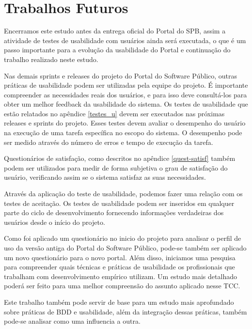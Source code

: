 \section{Trabalhos Futuros}

Encerramos este estudo antes da entrega oficial do Portal do SPB, assim a atividade de testes de usabilidade com usuários ainda será executada, o que é um passo importante para a evolução da usabilidade do Portal e continuação do trabalho realizado neste estudo.

Nas demais sprints e releases do projeto do Portal do Software Público, outras práticas de usabilidade podem ser utilizadas pela equipe do projeto. É importante compreender as necessidades reais dos usuários, e para isso deve consultá-los para obter um melhor feedback da usabilidade do sistema. Os testes de usabilidade que estão relatados no apêndice \ref{testes_u} devem ser executados nas próximas releases e sprints do projeto. Esses testes devem avaliar o desempenho do usuário na execução de uma tarefa específica no escopo do sistema. O desempenho pode ser medido através do número de erros e tempo de execução da tarefa. 

Questionários de satisfação, como descritos no apêndice \ref{quest-satisf} também podem ser utilizados para medir de forma subjetiva o grau de satisfação do usuário, verificando assim se o sistema satisfaz as suas necessidades.

Através da aplicação do teste de usabilidade, podemos fazer uma relação com os testes de aceitação. Os testes de usabilidade podem ser inseridos em qualquer parte do ciclo de desenvolvimento fornecendo informações verdadeiras dos usuários desde o início do projeto.

Como foi aplicado um questionário no inicio do projeto para analisar o perfil de uso da versão antiga do Portal do Software Público, pode-se também ser aplicado um novo questionário para o novo portal.
%
Além disso, iniciamos uma pesquisa para compreender quais técnicas e práticas de usabilidade os profissionais que trabalham com desenvolvimento empírico utilizam. Um estudo mais detalhado poderá ser feito para uma melhor compreensão do assunto aplicado nesse TCC. 

Este trabalho também pode servir de base para um estudo mais aprofundado sobre práticas de BDD e usabilidade, além da integração dessas práticas, também pode-se analisar como uma influencia a outra.
